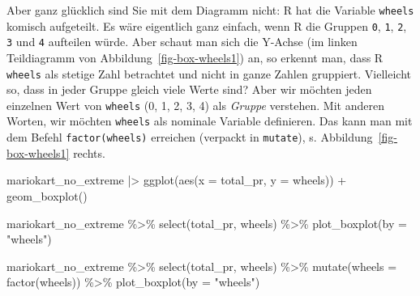 \documentclass[
  letterpaper,
  twoside,
  open=any]{scrbook}
\newenvironment{Shaded}{\begin{snugshade}}{\end{snugshade}}
\newcommand{\AttributeTok}[1]{\textcolor[rgb]{0.40,0.45,0.13}{#1}}
\newcommand{\FunctionTok}[1]{\textcolor[rgb]{0.28,0.35,0.67}{#1}}
\newcommand{\NormalTok}[1]{\textcolor[rgb]{0.00,0.23,0.31}{#1}}
\newcommand{\SpecialCharTok}[1]{\textcolor[rgb]{0.37,0.37,0.37}{#1}}
\newcommand{\StringTok}[1]{\textcolor[rgb]{0.13,0.47,0.30}{#1}}
\theoremstyle{definition}
\theoremstyle{definition}
\theoremstyle{definition}
\theoremstyle{remark}
\begin{document}
Aber ganz glücklich sind Sie mit dem Diagramm nicht: R hat die Variable
\texttt{wheels} komisch aufgeteilt. Es wäre eigentlich ganz einfach,
wenn R die Gruppen \texttt{0}, \texttt{1}, \texttt{2}, \texttt{3} und
\texttt{4} aufteilen würde. Aber schaut man sich die Y-Achse (im linken
Teildiagramm von Abbildung~\ref{fig-box-wheels1}) an, so erkennt man,
dass R \texttt{wheels} als stetige Zahl betrachtet und nicht in ganze
Zahlen gruppiert. Vielleicht so, dass in jeder Gruppe gleich viele Werte
sind? Aber wir möchten jeden einzelnen Wert von \texttt{wheels} (0, 1,
2, 3, 4) als \emph{Gruppe} verstehen. Mit anderen Worten, wir möchten
\texttt{wheels} als nominale Variable definieren. Das kann man mit dem
Befehl \texttt{factor(wheels)} erreichen (verpackt in \texttt{mutate}),
s. Abbildung~\ref{fig-box-wheels1} rechts.

\begin{Shaded}
\begin{Highlighting}[]
\NormalTok{mariokart\_no\_extreme }\SpecialCharTok{|\textgreater{}} 
  \FunctionTok{ggplot}\NormalTok{(}\FunctionTok{aes}\NormalTok{(}\AttributeTok{x =}\NormalTok{ total\_pr, }\AttributeTok{y =}\NormalTok{ wheels)) }\SpecialCharTok{+}
  \FunctionTok{geom\_boxplot}\NormalTok{()}
\end{Highlighting}
\end{Shaded}

\begin{Shaded}
\begin{Highlighting}[]
\NormalTok{mariokart\_no\_extreme }\SpecialCharTok{\%\textgreater{}\%} 
  \FunctionTok{select}\NormalTok{(total\_pr, wheels) }\SpecialCharTok{\%\textgreater{}\%} 
  \FunctionTok{plot\_boxplot}\NormalTok{(}\AttributeTok{by =} \StringTok{"wheels"}\NormalTok{) }

\NormalTok{mariokart\_no\_extreme }\SpecialCharTok{\%\textgreater{}\%} 
  \FunctionTok{select}\NormalTok{(total\_pr, wheels) }\SpecialCharTok{\%\textgreater{}\%} 
  \FunctionTok{mutate}\NormalTok{(}\AttributeTok{wheels =} \FunctionTok{factor}\NormalTok{(wheels)) }\SpecialCharTok{\%\textgreater{}\%} 
  \FunctionTok{plot\_boxplot}\NormalTok{(}\AttributeTok{by =} \StringTok{"wheels"}\NormalTok{) }
\end{Highlighting}
\end{Shaded}
\end{document}
